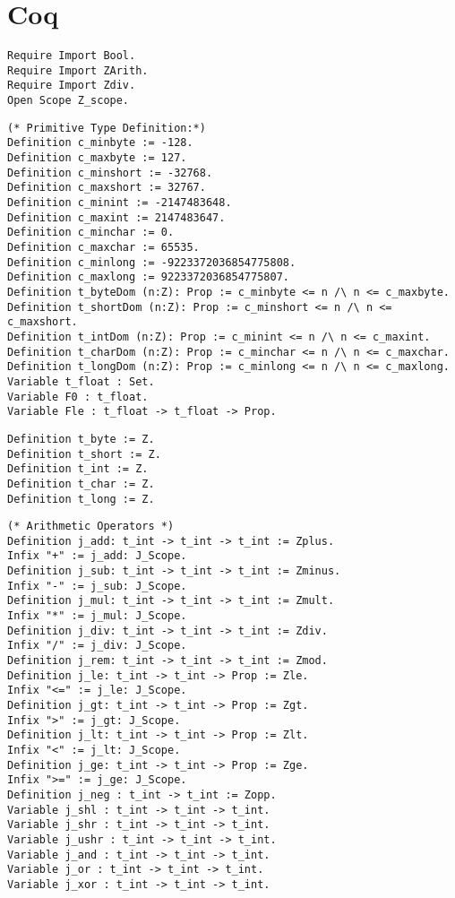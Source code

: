 \section{Coq}
\begin{verbatim}
Require Import Bool.
Require Import ZArith.
Require Import Zdiv.
Open Scope Z_scope.
\end{verbatim}
\begin{verbatim}
(* Primitive Type Definition:*)
Definition c_minbyte := -128.
Definition c_maxbyte := 127.
Definition c_minshort := -32768.
Definition c_maxshort := 32767.
Definition c_minint := -2147483648.
Definition c_maxint := 2147483647.
Definition c_minchar := 0.
Definition c_maxchar := 65535.
Definition c_minlong := -9223372036854775808.
Definition c_maxlong := 9223372036854775807.
Definition t_byteDom (n:Z): Prop := c_minbyte <= n /\ n <= c_maxbyte.
Definition t_shortDom (n:Z): Prop := c_minshort <= n /\ n <= c_maxshort.
Definition t_intDom (n:Z): Prop := c_minint <= n /\ n <= c_maxint.
Definition t_charDom (n:Z): Prop := c_minchar <= n /\ n <= c_maxchar.
Definition t_longDom (n:Z): Prop := c_minlong <= n /\ n <= c_maxlong.
Variable t_float : Set.
Variable F0 : t_float.
Variable Fle : t_float -> t_float -> Prop.
\end{verbatim}
\begin{verbatim}
Definition t_byte := Z.
Definition t_short := Z.
Definition t_int := Z.
Definition t_char := Z.
Definition t_long := Z.
\end{verbatim}
\begin{verbatim}
(* Arithmetic Operators *)
Definition j_add: t_int -> t_int -> t_int := Zplus.
Infix "+" := j_add: J_Scope.
Definition j_sub: t_int -> t_int -> t_int := Zminus.
Infix "-" := j_sub: J_Scope.
Definition j_mul: t_int -> t_int -> t_int := Zmult.
Infix "*" := j_mul: J_Scope.
Definition j_div: t_int -> t_int -> t_int := Zdiv.
Infix "/" := j_div: J_Scope.
Definition j_rem: t_int -> t_int -> t_int := Zmod.
Definition j_le: t_int -> t_int -> Prop := Zle.
Infix "<=" := j_le: J_Scope.
Definition j_gt: t_int -> t_int -> Prop := Zgt.
Infix ">" := j_gt: J_Scope.
Definition j_lt: t_int -> t_int -> Prop := Zlt.
Infix "<" := j_lt: J_Scope.
Definition j_ge: t_int -> t_int -> Prop := Zge.
Infix ">=" := j_ge: J_Scope.
Definition j_neg : t_int -> t_int := Zopp.
Variable j_shl : t_int -> t_int -> t_int.
Variable j_shr : t_int -> t_int -> t_int.
Variable j_ushr : t_int -> t_int -> t_int.
Variable j_and : t_int -> t_int -> t_int.
Variable j_or : t_int -> t_int -> t_int.
Variable j_xor : t_int -> t_int -> t_int.
\end{verbatim}
